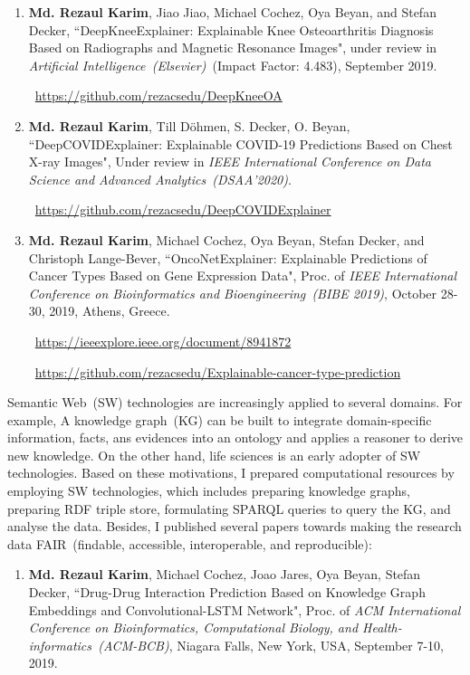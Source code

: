 \begin{appendices}
\begin{enumerate}[noitemsep]
	\item \textbf{Md. Rezaul Karim}, Jiao Jiao, Michael Cochez, Oya Beyan, and Stefan Decker, ``DeepKneeExplainer: Explainable Knee Osteoarthritis Diagnosis Based on Radiographs and Magnetic Resonance Images", under review in \emph{Artificial Intelligence~(Elsevier)}~(Impact Factor: 4.483), September 2019.

	\faGithub~\url{https://github.com/rezacsedu/DeepKneeOA}
	\item \textbf{Md. Rezaul Karim}, Till Döhmen, S. Decker, O. Beyan, ``DeepCOVIDExplainer: Explainable COVID-19 Predictions Based on Chest X-ray Images", Under review in \emph{IEEE International Conference on Data Science and Advanced Analytics~(DSAA’2020)}. 
	
	\faGithub~\url{https://github.com/rezacsedu/DeepCOVIDExplainer}
	
	\item \textbf{Md. Rezaul Karim}, Michael Cochez, Oya Beyan, Stefan Decker, and Christoph Lange-Bever, ``OncoNetExplainer: Explainable Predictions of Cancer Types Based on Gene Expression Data", Proc. of \emph{IEEE International Conference on Bioinformatics and Bioengineering~(BIBE 2019)}, October 28-30, 2019, Athens, Greece.
	
	\faLink~\url{https://ieeexplore.ieee.org/document/8941872}

	\faGithub~\url{https://github.com/rezacsedu/Explainable-cancer-type-prediction}
\end{enumerate}

Semantic Web~(SW) technologies are increasingly applied to several domains. For example, A knowledge graph~(KG) can be built to integrate domain-specific information, facts, ans evidences into an ontology and applies a reasoner to derive new knowledge. On the other hand, life sciences is an early adopter of SW technologies. Based on these motivations, I prepared computational resources by employing SW technologies, which includes preparing knowledge graphs, preparing RDF triple store, formulating SPARQL queries to query the KG, and analyse the data. Besides, I published several papers towards making the research data FAIR~(findable, accessible, interoperable, and reproducible): 

\begin{enumerate}[noitemsep]
	\item \textbf{Md. Rezaul Karim}, Michael Cochez, Joao Jares, Oya Beyan, Stefan Decker, ``Drug-Drug Interaction Prediction Based on Knowledge Graph Embeddings and Convolutional-LSTM Network", Proc. of \emph{ACM International Conference on Bioinformatics, Computational Biology, and Health-informatics~(ACM-BCB)}, Niagara Falls, New York, USA, September 7-10, 2019.
	

\end{enumerate}
\end{appendices}
